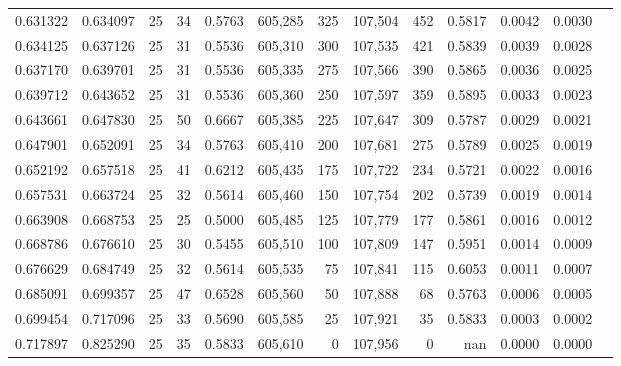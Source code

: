 \begin{tabular}{rrrrrrrrrrrrr}
0.631322 & 0.634097 &    25 &  34 &                                     0.5763 & 605,285 &     325 & 107,504 &     452 & 0.5817 & 0.0042 & 0.0030 \\
0.634125 & 0.637126 &    25 &  31 &                                     0.5536 & 605,310 &     300 & 107,535 &     421 & 0.5839 & 0.0039 & 0.0028 \\
0.637170 & 0.639701 &    25 &  31 &                                     0.5536 & 605,335 &     275 & 107,566 &     390 & 0.5865 & 0.0036 & 0.0025 \\
0.639712 & 0.643652 &    25 &  31 &                                     0.5536 & 605,360 &     250 & 107,597 &     359 & 0.5895 & 0.0033 & 0.0023 \\
0.643661 & 0.647830 &    25 &  50 &                                     0.6667 & 605,385 &     225 & 107,647 &     309 & 0.5787 & 0.0029 & 0.0021 \\
0.647901 & 0.652091 &    25 &  34 &                                     0.5763 & 605,410 &     200 & 107,681 &     275 & 0.5789 & 0.0025 & 0.0019 \\
0.652192 & 0.657518 &    25 &  41 &                                     0.6212 & 605,435 &     175 & 107,722 &     234 & 0.5721 & 0.0022 & 0.0016 \\
0.657531 & 0.663724 &    25 &  32 &                                     0.5614 & 605,460 &     150 & 107,754 &     202 & 0.5739 & 0.0019 & 0.0014 \\
0.663908 & 0.668753 &    25 &  25 &                                     0.5000 & 605,485 &     125 & 107,779 &     177 & 0.5861 & 0.0016 & 0.0012 \\
0.668786 & 0.676610 &    25 &  30 &                                     0.5455 & 605,510 &     100 & 107,809 &     147 & 0.5951 & 0.0014 & 0.0009 \\
0.676629 & 0.684749 &    25 &  32 &                                     0.5614 & 605,535 &      75 & 107,841 &     115 & 0.6053 & 0.0011 & 0.0007 \\
0.685091 & 0.699357 &    25 &  47 &                                     0.6528 & 605,560 &      50 & 107,888 &      68 & 0.5763 & 0.0006 & 0.0005 \\
0.699454 & 0.717096 &    25 &  33 &                                     0.5690 & 605,585 &      25 & 107,921 &      35 & 0.5833 & 0.0003 & 0.0002 \\
0.717897 & 0.825290 &    25 &  35 &                                     0.5833 & 605,610 &       0 & 107,956 &       0 &    nan & 0.0000 & 0.0000 \\
\bottomrule
\end{tabular}
